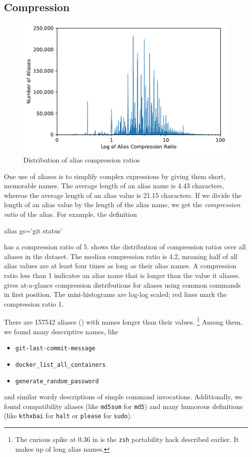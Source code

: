 \subsection{Compression}

\begin{figure}
    \centering
    \includegraphics[width=\columnwidth]{compression_dist.pdf}
    \caption{Distribution of alias compression ratios}
    \label{fig:compression}
\end{figure}

One use of aliases is to simplify complex expressions by giving them short, memorable names.
The average length of an alias name is \num{4.43} characters, whereas the average length of an alias value is \num{21.15} characters.
If we divide the length of an alias value by the length of the alias name, we get the \emph{compression ratio} of the alias.
For example, the definition
\begin{CVerbatim}
alias gs='git status'
\end{CVerbatim}
has a compression ratio of 5.
 shows the distribution of compression ratios over all aliases in the dataset.
The median compression ratio is 4.2, meaning half of all alias values are at least four times as long as their alias names.
A compression ratio less than 1 indicates an alias name that is longer than the value it aliases.
 gives at-a-glance compression distributions for aliases using common commands in first position.
The mini-histograms are log-log scaled; red lines mark the compression ratio 1.

There are \num{157542} aliases () with names longer than their values.%
\footnote{The curious spike at 0.36 in  is the \texttt{zsh} portability hack described earlier.
It makes up  of long alias names.}
Among them, we found many descriptive names, like
\begin{itemize}
    \item \verb|git-last-commit-message|
    \item \verb|docker_list_all_containers|
    \item \verb|generate_random_password|
\end{itemize}
and similar wordy descriptions of simple command invocations.
Additionally, we found compatibility aliases (like \texttt{md5sum} for \texttt{md5}) and many humorous definitions (like \texttt{kthxbai} for \texttt{halt} or \texttt{please} for \texttt{sudo}).


